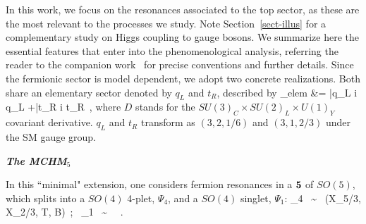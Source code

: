 In this work, we focus on the resonances associated to the top sector,
as these are the most relevant to the processes we study. Note Section~\ref{sect-illus} for a complementary study on Higgs coupling to gauge bosons.  We
summarize here the essential features that enter into the
phenomenological analysis, referring the reader to the companion
work~\cite{MCHMtthh} for precise conventions and further details.
Since the fermionic sector is model dependent, we adopt two concrete
realizations.  Both share an elementary sector denoted by $q_L$ and
$t_R$, described by
%
\bea
{}_{\rm elem} &= \bar{q}_L i  q_L +\bar{t}_R i  t_R~,
\label{elem}
\eea
%
where $D$ stands for the $SU(3)_C \times SU(2)_L \times U(1)_Y$
covariant derivative.  $q_L$ and $t_R$ transform as $(3,2,1/6)$ and
$(3,1,2/3)$ under the SM gauge group.

\medskip
\noindent
\textit{\small \bf The MCHM$_5$}
\medskip

In this ``minimal" extension, one considers fermion resonances in a
${\bf 5}$ of $SO(5)$, which splits into a $SO(4)$ 4-plet,
$\Psi_4$, and a $SO(4)$ singlet, $\Psi_1$:
%
\be
\Psi_4 ~\sim~ (X_{5/3}, X_{2/3}, T, B)~;~   \Psi_1 ~\sim~ ~.
\label{comp5content}
\ee
%

